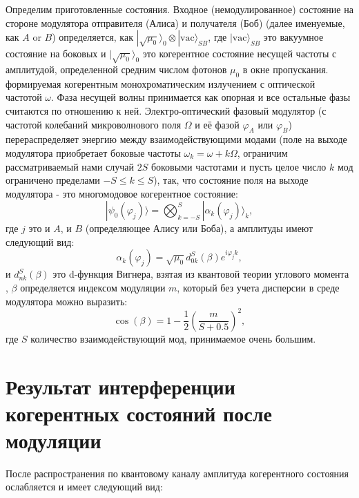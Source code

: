 Определим приготовленные состояния. Входное (немодулированное) состояние на стороне модулятора отправителя (Алиса) и получателя (Боб) (далее именуемые, как $A$ or $B$) определяется, как $|\sqrt{\mu_0}\rangle_0\otimes|\mathrm{vac}\rangle_{SB}$, где $|\mathrm{vac}\rangle_{SB}$ это вакуумное состояние на боковых и $|\sqrt{\mu_0}\rangle_0$ это когерентное состояние несущей частоты с амплитудой, определенной средним числом фотонов $\mu_0$ в окне пропускания. формируемая когерентным монохроматическим излучением с оптической частотой $\omega$. Фаза несущей волны принимается как опорная и все остальные фазы считаются по отношению к ней. Электро-оптический фазовый модулятор (с частотой колебаний микроволнового поля $\Omega$ и её фазой $\varphi_A$ или $\varphi_B$) перераспределяет энергию между взаимодействующими модами (поле на выходе модулятора приобретает боковые частоты $\omega_k=\omega+k\Omega$, ограничим рассматриваемый нами случай $2S$ боковыми частотами и пусть целое число $k$ мод ограничено пределами $-S\le k\le S$), так, что состояние поля на выходе модулятора - это многомодовое когерентное состояние: 
%
\begin{equation}\label{phi}
|\psi_0(\varphi_j)\rangle = \bigotimes_{k=-S}^S|{\alpha_k(\varphi_j)}\rangle_k,
\end{equation}
%
где $j$ это и $A$, и $B$ (определяющее Алису или Боба), а амплитуды имеют следующий вид: 
%
\begin{equation}\label{alpha}
\alpha_k(\varphi_j)=\sqrt{\mu_0}d^S_{0k}(\beta)e^{i\varphi_jk},
\end{equation}
%
и $d^S_{nk}(\beta)$ это d-функция Вигнера, взятая из квантовой теории углового момента \cite{varshalovich1988quantum}, $\beta$ определяется индексом модуляции $m$, который без учета дисперсии в среде модулятора можно выразить: 
%
\begin{equation}\label{betam}
\cos{({\beta})}=1-\frac{1}{2}{\left(\frac{m}{S+0.5}\right)^2},
\end{equation}
где $S$ количество взаимодействующий мод, принимаемое очень большим. 

\pagebreak

\section{Результат интерференции когерентных состояний после модуляции} \label{ch:ch4/sec6}

После распространения по квантовому каналу амплитуда когерентного состояния ослабляется и имеет следующий вид:


